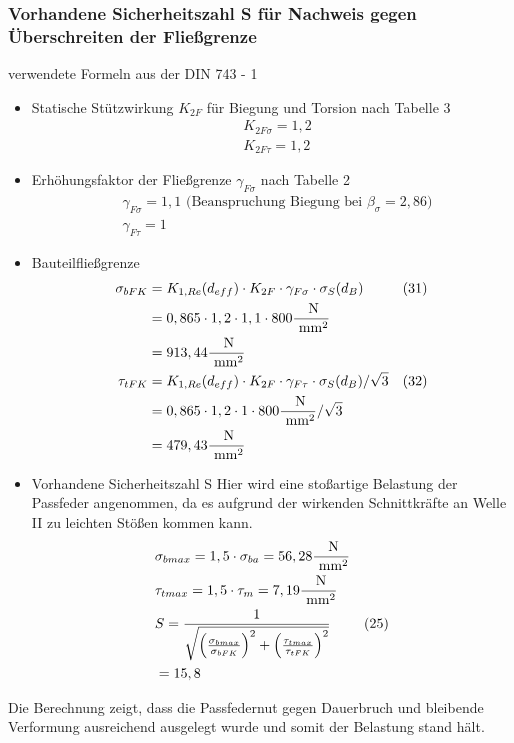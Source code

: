 \subsubsection{Vorhandene Sicherheitszahl S für Nachweis gegen Überschreiten der Fließgrenze}
verwendete Formeln aus der DIN 743 - 1
\begin{itemize}
	\item Statische Stützwirkung $K_{2F}$ für Biegung und Torsion nach Tabelle 3
	\begin{align*}
		&K_{2F \sigma} = 1,2 \\
		&K_{2F \tau} = 1,2 
	\end{align*}
	\item Erhöhungsfaktor der Fließgrenze $\gamma_{F\sigma}$ nach Tabelle 2
	\begin{align*}
		&\gamma_{F\sigma} = 1,1 \text{ (Beanspruchung Biegung bei } \beta_{\sigma} = 2,86 \text{)} \\
		&\gamma_{F\tau} = 1 
	\end{align*}
	\item Bauteilfließgrenze
	\begin{align*}
		\sigma_{bFK} &= K_{1,Re} (d_{eff}) \cdot K_{2F} \cdot \gamma_{F\sigma} \cdot \sigma_S (d_B) & (31)\\
		&= 0,865 \cdot 1,2 \cdot 1,1 \cdot 800 \frac{\text{ N}}{\text{ mm}^2} \\
		&= 913,44 \frac{\text{ N}}{\text{ mm}^2}\\
		\tau_{tFK} &= K_{1,Re} (d_{eff}) \cdot K_{2F} \cdot \gamma_{F\tau} \cdot \sigma_S (d_B) / \sqrt{3} & (32)\\
		&= 0,865 \cdot 1,2 \cdot 1 \cdot 800 \frac{\text{ N}}{\text{ mm}^2} / \sqrt{3}\\
		&= 479,43 \frac{\text{ N}}{\text{ mm}^2}
	\end{align*}
	\item Vorhandene Sicherheitszahl S 
	Hier wird eine stoßartige Belastung der Passfeder angenommen, da es aufgrund der wirkenden Schnittkräfte an Welle II zu leichten Stößen kommen kann.
	\begin{align*}
		&\sigma_{bmax} = 1,5 \cdot \sigma_{ba} = 56,28 \frac{\text{ N}}{\text{ mm}^2} \\
		&\tau_{tmax} = 1,5 \cdot \tau_{m} = 7,19 \frac{\text{ N}}{\text{ mm}^2} \\
		&S = \frac{1}{\sqrt{\left( \frac{\sigma_{bmax}}{\sigma_{bFK}} \right)^2 +\left( \frac{\tau_{tmax}}{\tau_{tFK}} \right)^2 }} & (25)\\
		&= 15,8 
	\end{align*}
\end{itemize}
Die Berechnung zeigt, dass die Passfedernut gegen Dauerbruch und bleibende Verformung ausreichend ausgelegt wurde und somit der Belastung stand hält.
\newpage
